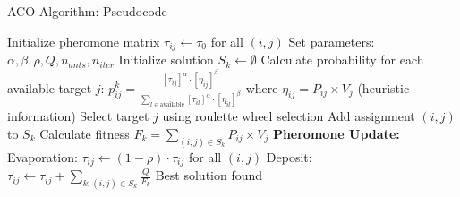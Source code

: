 \documentclass[aspectratio=43,8pt]{beamer}
\begin{document}
\begin{frame}[fragile]{ACO Algorithm: Pseudocode}
\begin{algorithm}[H]
\caption{Ant Colony Optimization (ACO) Metaheuristic for WTA}
\begin{algorithmic}[1]
\State Initialize pheromone matrix $\tau_{ij} \gets \tau_0$ for all $(i,j)$
\State Set parameters: $\alpha, \beta, \rho, Q, n_{ants}, n_{iter}$
        \State Initialize solution $S_k \gets \emptyset$
            \State Calculate probability for each available target $j$:
            \State \quad $p_{ij}^k = \frac{[\tau_{ij}]^\alpha \cdot [\eta_{ij}]^\beta}{\sum_{l \in \text{available}} [\tau_{il}]^\alpha \cdot [\eta_{il}]^\beta}$
            \State \quad where $\eta_{ij} = P_{ij} \times V_j$ (heuristic information)
            \State Select target $j$ using roulette wheel selection
            \State Add assignment $(i,j)$ to $S_k$
        \EndFor
        \State Calculate fitness $F_k = \sum_{(i,j) \in S_k} P_{ij} \times V_j$
    \EndFor
    \State \textbf{Pheromone Update:}
    \State \quad Evaporation: $\tau_{ij} \gets (1-\rho) \cdot \tau_{ij}$ for all $(i,j)$
    \State \quad Deposit: $\tau_{ij} \gets \tau_{ij} + \sum_{k: (i,j) \in S_k} \frac{Q}{F_k}$
\EndFor
\State \Return Best solution found
\end{algorithmic}
\end{algorithm}
\end{frame}
\end{document}
